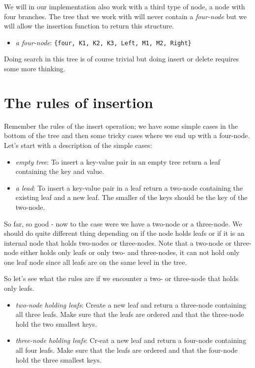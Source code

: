 \documentclass[a4paper,11pt]{article}
\begin{document}
  
We will in our implementation also work with a third type of node, a
node with four branches. The tree that we work with will never contain
a {\em four-node} but we will allow the insertion function to return
this structure.

\begin{itemize}
  \item {\em a four-node}: {\tt \{four, K1, K2, K3, Left, M1, M2, Right\}}      
\end{itemize}

Doing search in this tree is of course trivial but doing insert or
delete requires some more thinking. 

\section{The rules of insertion}

Remember the rules of the insert operation; we have some simple cases
in the bottom of the tree and then some tricky cases where we end up
with a four-node. Let's start with a description of the simple cases:

\begin{itemize}

\item {\em empty tree}: To insert a key-value pair in an empty tree
  return a leaf containing the key and value.

  \item {\em a lead}: To insert a key-value pair in a leaf return a
    two-node containing the existing leaf and a new leaf. The smaller
    of the keys should be the key of the two-node.
\end{itemize}  

So far, so good - now to the case were we have a two-node or a
three-node. We should do quite different thing depending on if the
node holds leafs or if it is an internal node that holds two-nodes or
three-nodes. Note that a two-node or three-node either holds only
leafs or only two- and three-nodes, it can not hold only one leaf node
since all leafs are on the same level in the tree.

So let's see what the rules are if we encounter a two- or three-node
that holds only leafs.

\begin{itemize}
  \item {\em two-node holding leafs}: Create a new leaf and return a
    three-node containing all three leafs. Make sure that the leafs
    are ordered and that the three-node hold the two smallest keys.

  \item {\em three-node holding leafs}: Cr-eat a new leaf and return a
    four-node containing all four leafs. Make sure that the leafs
    are ordered and that the four-node hold the three smallest keys.     
\end{itemize}
\end{document}
